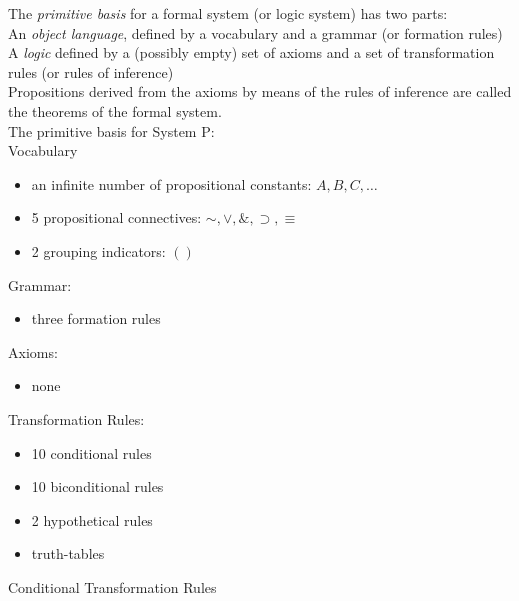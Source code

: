 The \textit{primitive basis} for a formal system (or logic system)
 has two parts:\\
 An \textit{object language}, defined by a vocabulary and a grammar (or formation rules)\\
 A \textit{logic} defined by a (possibly empty) set of axioms and a set of transformation rules (or rules of inference)\\
 Propositions derived from the axioms by means of the rules of inference are called the theorems of the formal system.\\
 
 The primitive basis for System P:\\
 Vocabulary
 \begin{itemize}
     \item an infinite number of propositional constants: $A,B,C,\ldots$
     \item 5 propositional connectives: $\sim,\vee,\&,\supset,\equiv$
     \item 2 grouping indicators: $()$
 \end{itemize}
 Grammar:
 \begin{itemize}
     \item three formation rules
 \end{itemize}
 Axioms:
 \begin{itemize}
     \item none
 \end{itemize}
 Transformation Rules:
 \begin{itemize}
     \item 10 conditional rules
     \item 10 biconditional rules
     \item 2 hypothetical rules
     \item truth-tables
 \end{itemize}
 Conditional Transformation Rules
